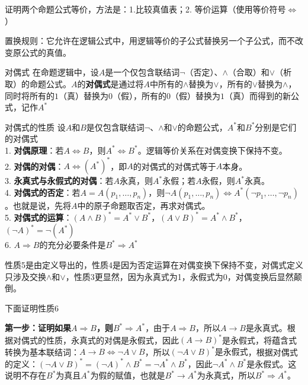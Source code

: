 证明两个命题公式等价，方法是：1.比较真值表；2. 等价运算（使用等价符号$\Leftrightarrow$）

置换规则：它允许在逻辑公式中，用逻辑等价的子公式替换另一个子公式，而不改变原公式的真值。
\begin{definition}{对偶式}{}
    在命题逻辑中，设$A$是一个仅包含联结词$\neg$（否定）、$\land$（合取）和$\lor$（析取）的命题公式。$A$的\textbf{对偶式}是通过将$A$中所有的$\land$替换为$\lor$，所有的$\lor$替换为$\land$，同时将所有的$1$（真）替换为$0$（假），所有的$0$（假）替换为$1$（真）而得到的新公式，记作$A^*$
\end{definition}
\begin{theorem}{对偶式的性质}{}
设$A$和$B$是仅包含联结词$\neg$、$\land$和$\lor$的命题公式，$A^*$和$B^*$分别是它们的对偶式\\
1. \textbf{对偶原理}：若$A \Leftrightarrow B$，则$A^* \Leftrightarrow B^*$。逻辑等价关系在对偶变换下保持不变。\\
2. \textbf{对偶的对偶}：$A \Leftrightarrow (A^*)^*$，即$A$的对偶式的对偶式等于$A$本身。\\
3. \textbf{永真式与永假式的对偶}：若$A$永真，则$A^*$永假；若$A$永假，则$A^*$永真。\\
4. \textbf{对偶式的否定}：若$A=A(p_1,\ldots,p_n)$，则$\neg A(p_1,\ldots,p_n)\Leftrightarrow A^*(\neg p_1,\ldots,\neg p_n)$。也就是说，先将$A$中的原子命题取否定，再求对偶式。\\
5. \textbf{对偶式的运算}：$(A \land B)^* = A^* \lor B^*$，$(A \lor B)^* = A^* \land B^*$，$(\neg A)^* = \neg (A^*)$\\
6. $A\Rightarrow B$的充分必要条件是$B^* \Rightarrow A^*$
\end{theorem}
性质5是由定义导出的，性质4是因为否定运算在对偶变换下保持不变，对偶式定义只涉及交换$\land$和$\lor$，性质3更显然，因为永真式为1，永假式为0，对偶变换后显然颠倒。

下面证明性质6

\textbf{第一步：证明如果$A \Rightarrow B$，则$B^* \Rightarrow A^*$}，由于$A \Rightarrow B$，所以$A \rightarrow B$是永真式。根据对偶式的性质，永真式的对偶是永假式，因此$(A \rightarrow B)^* $是永假式，将蕴含式转换为基本联结词：$A \rightarrow B \Leftrightarrow \neg A \lor B$，所以$(\neg A \lor B)^* \text{是永假式}$，根据对偶式的定义：$(\neg A \lor B)^* = (\neg A)^* \land B^* = \neg A^* \land B^*$，因此$\neg A^* \land B^*$是永假式。这说明不存在$B^*$为真且$A^*$为假的赋值，也就是$B^*\rightarrow A^*$为永真式，所以$B^* \Rightarrow A^*$。

